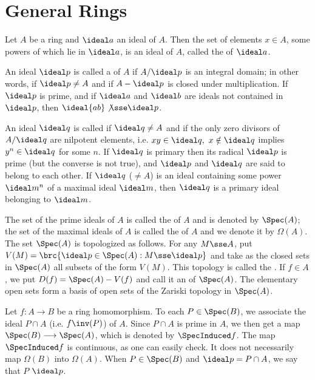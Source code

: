 \documentclass[../main]{subfiles}
\begin{document}
\section{General Rings}\label{sec:01}

\newparagraph
Let $A$ be a ring and $\ideal a$ an ideal of $A$. Then the set of elements $x\in A$, some powers of which lie in $\ideal a$, is an ideal of $A$, called the  of $\ideal a$.

An ideal $\ideal p$ is called a  of $A$ if $A/\ideal p$ is an integral domain; in other words, if $\ideal p\ne A$ and if $A-\ideal p$ is closed under multiplication. If $\ideal p$ is prime, and if $\ideal a$ and $\ideal b$ are ideals not contained in $\ideal p$, then $\ideal{ab}\not\sse\ideal p$.

An ideal $\ideal q$ is called  if $\ideal q\ne A$ and if the only zero divisors of $A/\ideal q$ are nilpotent elements, i.e. $xy\in\ideal q,~x\notin\ideal q$ implies $y^n\in\ideal q$ for some $n$. If $\ideal q$ is primary then its radical $\ideal p$ is prime (but the converse is not true), and $\ideal p$ and $\ideal q$ are said to belong to each other. If $\ideal q$ ($\ne A$) is an ideal containing some power $\ideal m^n$ of a maximal ideal $\ideal m$, then $\ideal q$ is a primary ideal belonging to $\ideal m$.

The set of the prime ideals of $A$ is called the  of $A$ and is denoted by $\Spec(A)$; the set of the maximal ideals of $A$ is called the  of $A$ and we denote it by $\Omega(A)$. The set $\Spec(A)$ is topologized as follows. For any $M\sse A$, put $V(M) = \brc{\ideal p\in\Spec(A): M\sse\ideal p}$ and take as the closed sets in $\Spec(A)$ all subsets of the form $V(M)$. This topology is called the . If $f\in A$, we put $D(f)=\Spec(A)-V(f)$ and call it an  of $\Spec(A)$. The elementary open sets form a basis of open sets of the Zariski topology in $\Spec(A)$.

Let $f:A\longrightarrow B$ be a ring homomorphism. To each $P\in\Spec(B)$, we associate the ideal $P\cap A$ (i.e. $f\inv(P)$) of $A$. Since $P\cap A$ is prime in $A$, we then get a map $\Spec(B)\longrightarrow\Spec(A)$, which is denoted by $\SpecInduced f$. The map $\SpecInduced f$ is continuous, as one can easily check. It does not necessarily map $\Omega(B)$ into $\Omega(A)$. When $P\in\Spec(B)$ and $\ideal p=P\cap A$, we say that $P$  $\ideal p$.
\end{document}
